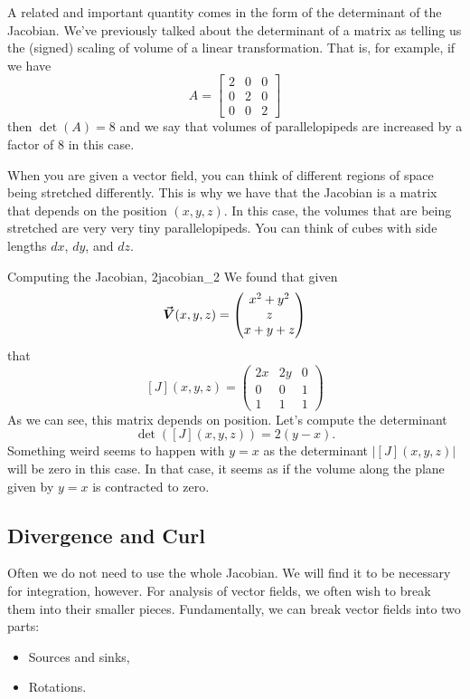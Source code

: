 		        
		        A related and important quantity comes in the form of the determinant of the Jacobian.  We've previously talked about the determinant of a matrix as telling us the (signed) scaling of volume of a linear transformation.  That is, for example, if we have
		        \[
		        A = \begin{bmatrix} 2 & 0 & 0\\ 0 & 2 & 0\\ 0 & 0 & 2 \end{bmatrix}
		        \]
		        then $\det(A)=8$ and we say that volumes of parallelopipeds are increased by a factor of $8$ in this case.  
		        
		        When you are given a vector field, you can think of different regions of space being stretched differently.  This is why we have that the Jacobian is a matrix that depends on the position $(x,y,z)$.  In this case, the volumes that are being stretched are very very tiny parallelopipeds.  You can think of cubes with side lengths $dx$, $dy$, and $dz$. 
		        
		        \begin{ex}{Computing the Jacobian, 2}{jacobian_2}
		        We found that given
		        \[
		        \boldsymbol{\vec{V}}(x,y,z) = \begin{pmatrix} x^2+y^2 \\ z \\ x+y+z\end{pmatrix}
		        \]
		        that
		        \[
		        [J](x,y,z) = \begin{pmatrix} 2x & 2y & 0 \\ 0 & 0 & 1 \\ 1 & 1 & 1 \end{pmatrix}
		        \]
		        As we can see, this matrix depends on position.  Let's compute the determinant
		        \[
		        \det([J](x,y,z))=2(y-x). 
		        \]
		        Something weird seems to happen with $y=x$ as the determinant $|[J](x,y,z)|$ will be zero in this case. In that case, it seems as if the volume along the plane given by $y=x$ is contracted to zero.
		        \end{ex}
		        
		        \subsection{Divergence and Curl}
		        Often we do not need to use the whole Jacobian.  We will find it to be necessary for integration, however.  For analysis of vector fields, we often wish to break them into their smaller pieces.  Fundamentally, we can break vector fields into two parts:
		        \begin{itemize}
		            \item Sources and sinks,
		            \item Rotations.
		        \end{itemize}
		        
